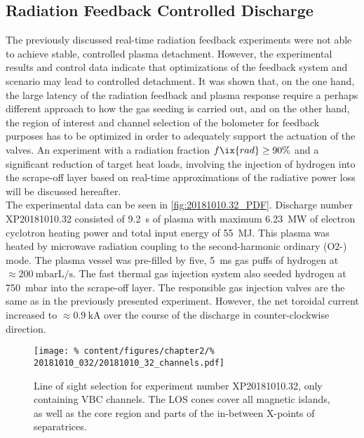         \subsection{Radiation Feedback Controlled Discharge}\label{subsec:primew7xfeedback}%
%
            The previously discussed real-time radiation feedback experiments were not able to achieve stable, controlled plasma detachment. However, the experimental results and control data indicate that optimizations of the feedback system and scenario may lead to controlled detachment. It was shown that, on the one hand, the large latency of the radiation feedback and plasma response require a perhaps different approach to how the gas seeding is carried out, and on the other hand, the region of interest and channel selection of the bolometer for feedback purposes has to be optimized in order to adequately support the actuation of the valves. An experiment with a radiation fraction $f\ix{rad}\ge90\%$ and a significant reduction of target heat loads, involving the injection of hydrogen into the scrape-off layer based on real-time approximations of the radiative power loss will be discussed hereafter.\\%
            The experimental data can be seen in \cref{fig:20181010.32_PDF}. Discharge number XP20181010.32 consisted of \SI{9.2}{\second} of plasma with maximum \SI{6.23}{\mega\watt} of electron cyclotron heating power and total input energy of \SI{55}{\mega\joule}. This plasma was heated by microwave radiation coupling to the second-harmonic ordinary (O2-) mode. The plasma vessel was pre-filled by five, \SI{5}{\milli\second} gas puffs of hydrogen at $\approx\SI{200}{\milli\bar\liter\per\second}$. The fast thermal gas injection system also seeded hydrogen at \SI{750}{\milli\bar} into the scrape-off layer. The responsible gas injection valves are the same as in the previously presented experiment. However, the net toroidal current increased to $\approx\SI{0.9}{\kilo\ampere}$ over the course of the discharge in counter-clockwise direction.\\%
%
            \begin{figure}[t]%
                \centering%
                \captionsetup{width=.45\textwidth}%
                \begin{minipage}[c]{0.45\textwidth}%
                    \caption{Line of sight selection for experiment number XP20181010.32, only containing VBC channels. The LOS cones cover all magnetic islands, as well as the core region and parts of the in-between X-points of separatrices.}\label{fig:20181010.32_channels}%
                \end{minipage}%
                \hfill%
                \begin{minipage}[c]{0.5\textwidth}%
                    \texttt{[image: \%
                        content/figures/chapter2/\%
                        20181010\_032/20181010\_32\_channels.pdf]}%
                \end{minipage}%
            \end{figure}%
